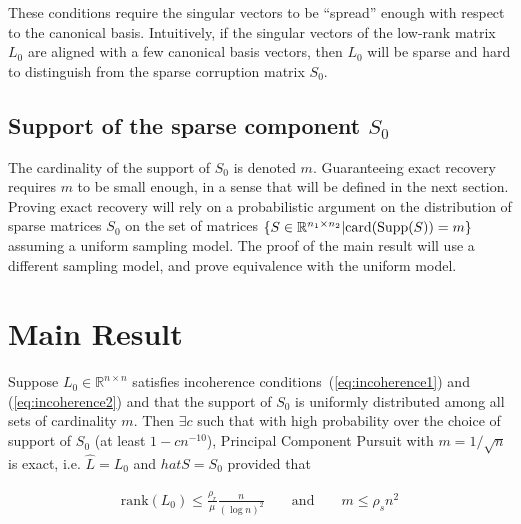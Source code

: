 These conditions require the singular vectors to be ``spread'' enough with respect to the canonical basis. Intuitively, if the singular vectors of the low-rank matrix $L_0$ are aligned with a few canonical basis vectors, then $L_0$ will be sparse and hard to distinguish from the sparse corruption matrix $S_0$.



\subsection{Support of the sparse component $S_0$}
The cardinality of the support of $S_0$ is denoted $m$. Guaranteeing exact recovery requires $m$ to be small enough, in a sense that will be defined in the next section. Proving exact recovery will rely on a probabilistic argument on the distribution of sparse matrices $S_0$ on the set of matrices $\{ S \in {\mathbb R}^{n_1 \times n_2} | \text{card}(\text{Supp}(S)) = m \}$ assuming a uniform sampling model. The proof of the main result will use a different sampling model, and prove equivalence with the uniform model.


\section{Main Result}
\begin{theorem}
\label{thm:pcp}
Suppose $L_0 \in \mathbb{R}^{n \times n}$ satisfies incoherence conditions~(\ref{eq:incoherence1}) and (\ref{eq:incoherence2}) and that the support of $S_0$ is uniformly distributed among all sets of cardinality $m$. Then $\exists c$ such that with high probability over the choice of support of $S_0$ (at least $1-cn^{-10}$), Principal Component Pursuit with $m = 1/\sqrt{n}$ is exact, i.e. $\hat{L} = L_0$ and $hat{S} = S_0$ provided that

\begin{equation}
\begin{aligned}
\text{rank}(L_0) \leq \frac{\rho_r}{\mu} \frac{n}{(\log n)^2} && \text{ and } && m \leq \rho_s n^2
\end{aligned}
\end{equation}

\end{theorem}

